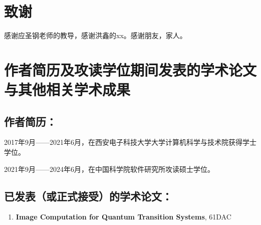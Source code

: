 \chapter[致谢]{致\quad 谢}%

感谢应圣钢老师的教导，感谢洪鑫的xx。感谢朋友，家人。

\chapter{作者简历及攻读学位期间发表的学术论文与其他相关学术成果}

\section*{作者简历：}
2017年9月——2021年6月，在西安电子科技大学大学计算机科学与技术院获得学士学位。


2021年9月——2024年6月，在中国科学院软件研究所攻读硕士学位。


\section*{已发表（或正式接受）的学术论文：}

{
\setlist[enumerate]{}%
\begin{enumerate}[nosep]
    \item \textbf{Image Computation for Quantum Transition Systems}, 61DAC
\end{enumerate}
}





\cleardoublepage[plain]%
